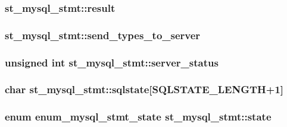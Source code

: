 \subsubsection[{result}]{ st\+\_\+mysql\+\_\+stmt\+::result}\label{structst__mysql__stmt_a198cbcc8f7faf73522a281dec2e1e434}
\hypertarget{structst__mysql__stmt_a18b9cca9708b5d7ac8dba93f68e8da9c}{}
\subsubsection[{send\+\_\+types\+\_\+to\+\_\+server}]{ st\+\_\+mysql\+\_\+stmt\+::send\+\_\+types\+\_\+to\+\_\+server}\label{structst__mysql__stmt_a18b9cca9708b5d7ac8dba93f68e8da9c}
\hypertarget{structst__mysql__stmt_af2b6c14f77e053b0cb952f4bc838a94a}{}
\subsubsection[{server\+\_\+status}]{\setlength{\rightskip}{0pt plus 5cm}unsigned int st\+\_\+mysql\+\_\+stmt\+::server\+\_\+status}\label{structst__mysql__stmt_af2b6c14f77e053b0cb952f4bc838a94a}
\hypertarget{structst__mysql__stmt_a4bc2da06a308a95a0e5af923239493b5}{}
\subsubsection[{sqlstate}]{\setlength{\rightskip}{0pt plus 5cm}char st\+\_\+mysql\+\_\+stmt\+::sqlstate\mbox{[}{\bf S\+Q\+L\+S\+T\+A\+T\+E\+\_\+\+L\+E\+N\+G\+T\+H}+1\mbox{]}}\label{structst__mysql__stmt_a4bc2da06a308a95a0e5af923239493b5}
\hypertarget{structst__mysql__stmt_a30dfb09d512d7b9397f8bea13bfc319b}{}
\subsubsection[{state}]{\setlength{\rightskip}{0pt plus 5cm}enum {\bf enum\+\_\+mysql\+\_\+stmt\+\_\+state} st\+\_\+mysql\+\_\+stmt\+::state}\label{structst__mysql__stmt_a30dfb09d512d7b9397f8bea13bfc319b}
\hypertarget{structst__mysql__stmt_ad800f40b351919f8d6e9c9a4d757ab72}{}
